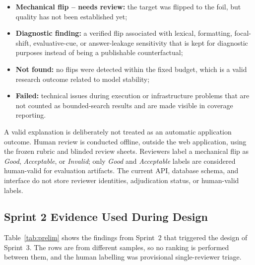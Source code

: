 \documentclass[11pt,a4paper]{article}
\begin{document}
\begin{itemize}
  \item \textbf{Mechanical flip -- needs review:} the target was flipped to the foil,
  but quality has not been established yet;
  \item \textbf{Diagnostic finding:} a verified flip associated with lexical, formatting,
  focal-shift, evaluative-cue, or answer-leakage sensitivity that is kept for
  diagnostic purposes instead of being a publishable counterfactual;
  \item \textbf{Not found:} no flips were detected within the fixed budget, which is
  a valid research outcome related to model stability;
  \item \textbf{Failed:} technical issues during execution or infrastructure problems
  that are not counted as bounded-search results and are made visible in coverage
  reporting.
\end{itemize}

A valid explanation is deliberately not treated as an automatic application outcome.
Human review is conducted offline, outside the web application, using the frozen
rubric and blinded review sheets. Reviewers label a mechanical flip as \emph{Good},
\emph{Acceptable}, or \emph{Invalid}; only \emph{Good} and \emph{Acceptable} labels
are considered human-valid for evaluation artifacts. The current API, database
schema, and interface do not store reviewer identities, adjudication status, or
human-valid labels.

\subsection{Sprint 2 Evidence Used During Design}

Table~\ref{tab:prelim} shows the findings from Sprint~2 that triggered the design of
Sprint~3. The rows are from different samples, so no ranking is performed between
them, and the human labelling was provisional single-reviewer triage.
\end{document}
